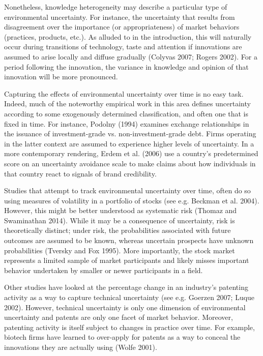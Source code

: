 Nonetheless, knowledge heterogeneity may describe a particular type of environmental uncertainty. For instance, the uncertainty that results from disagreement over the importance (or appropriateness) of market behaviors (practices, products, etc.). As alluded to in the introduction, this will naturally occur during transitions of technology, taste and attention if innovations are assumed to arise locally and diffuse gradually (Colyvas 2007; Rogers 2002). For a period following the innovation, the variance in knowledge and opinion of that innovation will be more pronounced.

Capturing the effects of environmental uncertainty over time is no easy task. Indeed, much of the noteworthy empirical work in this area defines uncertainty according to some exogenously determined classification, and often one that is fixed in time. For instance, Podolny (1994) examines exchange relationships in the issuance of investment-grade vs. non-investment-grade debt. Firms operating in the latter context are assumed to experience higher levels of uncertainty. In a more contemporary rendering, Erdem et al. (2006) use a country's predetermined score on an uncertainty avoidance scale to make claims about how individuals in that country react to signals of brand credibility. 

Studies that attempt to track environmental uncertainty over time, often do so using measures of volatility in a portfolio of stocks (see e.g. Beckman et al. 2004). However, this might be better understood as systematic risk (Thomaz and Swaminathan 2014). While it may be a consequence of uncertainty, risk is theoretically distinct; under risk, the probabilities associated with future outcomes are assumed to be known, whereas uncertain prospects have unknown probabilities (Tversky and Fox 1995). More importantly, the stock market represents a limited sample of market participants and likely misses important behavior undertaken by smaller or newer participants in a field. 

Other studies have looked at the percentage change in an industry's patenting activity as a way to capture technical uncertainty (see e.g. Goerzen 2007; Luque 2002). However, technical uncertainty is only one dimension of environmental uncertainty and patents are only one facet of market behavior. Moreover, patenting activity is itself subject to changes in practice over time. For example, biotech firms have learned to over-apply for patents as a way to conceal the innovations they are actually using (Wolfe 2001).


